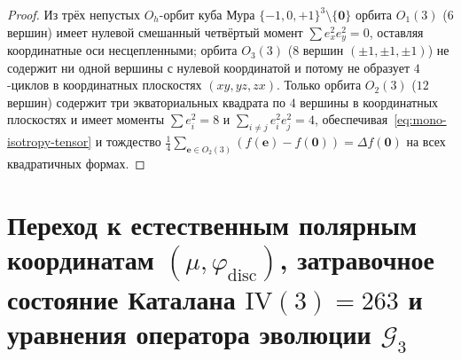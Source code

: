\begin{proof}
Из трёх непустых $O_h$-орбит куба Мура $\{-1,0,+1\}^3\setminus\{\mathbf{0}\}$ орбита $O_1(3)$ ($6$ вершин) имеет нулевой смешанный четвёртый момент $\sum e_x^2 e_y^2 = 0$, оставляя координатные оси несцепленными; орбита $O_3(3)$ ($8$ вершин $(\pm 1,\pm 1,\pm 1)$) не содержит ни одной вершины с нулевой координатой и потому не образует $4$-циклов в координатных плоскостях $(xy, yz, zx)$. Только орбита $O_2(3)$ ($12$ вершин) содержит три экваториальных квадрата по $4$ вершины в координатных плоскостях и имеет моменты $\sum e_i^2 = 8$ и $\sum_{i\ne j} e_i^2 e_j^2 = 4$, обеспечивая~\eqref{eq:mono-isotropy-tensor} и тождество $\frac{1}{4}\sum_{\mathbf{e}\in O_2(3)}(f(\mathbf{e}) - f(\mathbf{0})) = \Delta f(\mathbf{0})$ на всех квадратичных формах.
\end{proof}

\section{Переход к естественным полярным координатам \texorpdfstring{$(\mu, \varphi_{\mathrm{disc}})$}{(mu, phi\_disc)}, затравочное состояние Каталана \texorpdfstring{$\mathrm{IV}(3) = 263$}{IV(3) = 263} и уравнения оператора эволюции \texorpdfstring{$\mathcal{G}_3$}{G3}}

